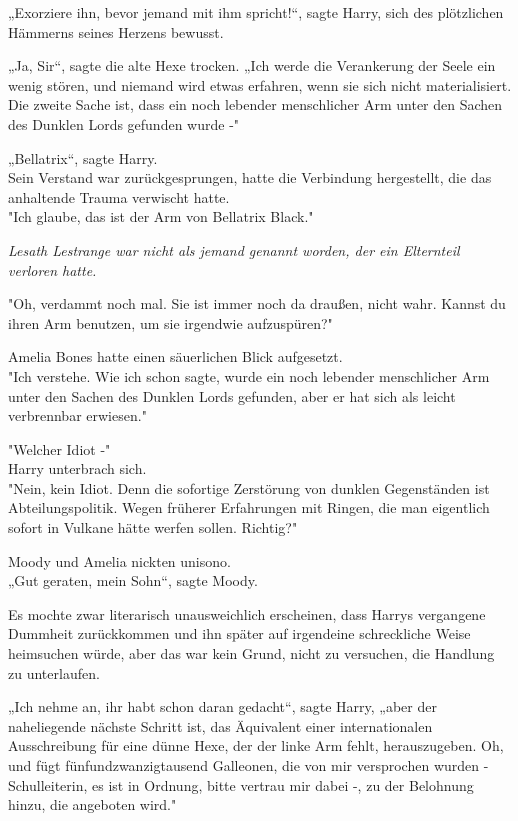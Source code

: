 {„Exorziere ihn, bevor jemand mit ihm spricht!“, sagte Harry, sich des plötzlichen Hämmerns seines Herzens bewusst.

„Ja, Sir“, sagte die alte Hexe trocken. „Ich werde die Verankerung der Seele ein wenig stören, und niemand wird etwas erfahren, wenn sie sich nicht materialisiert.\\ Die zweite Sache ist, dass ein noch lebender menschlicher Arm unter den Sachen des Dunklen Lords gefunden wurde -"

„Bellatrix“, sagte Harry.\\ Sein Verstand war zurückgesprungen, hatte die Verbindung hergestellt, die das anhaltende Trauma verwischt hatte.\\ "Ich glaube, das ist der Arm von Bellatrix Black."

\emph{Lesath Lestrange war nicht als jemand genannt worden, der ein Elternteil verloren hatte.}

"Oh, verdammt noch mal. Sie ist immer noch da draußen, nicht wahr. Kannst du ihren Arm benutzen, um sie irgendwie aufzuspüren?"

Amelia Bones hatte einen säuerlichen Blick aufgesetzt.\\ "Ich verstehe. Wie ich schon sagte, wurde ein noch lebender menschlicher Arm unter den Sachen des Dunklen Lords gefunden, aber er hat sich als leicht verbrennbar erwiesen."

"Welcher Idiot -"\\ Harry unterbrach sich.\\ "Nein, kein Idiot. Denn die sofortige Zerstörung von dunklen Gegenständen ist Abteilungspolitik. Wegen früherer Erfahrungen mit Ringen, die man eigentlich sofort in Vulkane hätte werfen sollen. Richtig?"

Moody und Amelia nickten unisono.\\ „Gut geraten, mein Sohn“, sagte Moody.

Es mochte zwar literarisch unausweichlich erscheinen, dass Harrys vergangene Dummheit zurückkommen und ihn später auf irgendeine schreckliche Weise heimsuchen würde, aber das war kein Grund, nicht zu versuchen, die Handlung zu unterlaufen.

„Ich nehme an, ihr habt schon daran gedacht“, sagte Harry, „aber der naheliegende nächste Schritt ist, das Äquivalent einer internationalen Ausschreibung für eine dünne Hexe, der der linke Arm fehlt, herauszugeben. Oh, und fügt fünfundzwanzigtausend Galleonen, die von mir versprochen wurden - Schulleiterin, es ist in Ordnung, bitte vertrau mir dabei -, zu der Belohnung hinzu, die angeboten wird."

}
